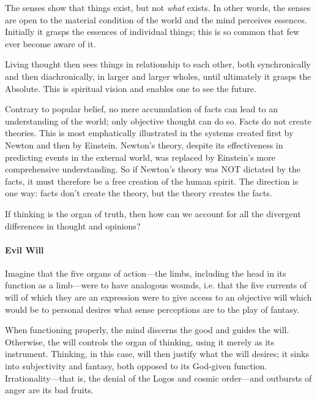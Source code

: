The senses show that things exist, but not \emph{what} exists. In other words, the senses are open to the material condition of the world and the mind perceives essences. Initially it grasps the essences of individual things; this is so common that few ever become aware of it.

Living thought then sees things in relationship to each other, both synchronically and then diachronically, in larger and larger wholes, until ultimately it grasps the Absolute. This is spiritual vision and enables one to see the future.

Contrary to popular belief, no mere accumulation of facts can lead to an understanding of the world; only objective thought can do so. Facts do not create theories. This is most emphatically illustrated in the systems created first by Newton and then by Einstein. Newton's theory, despite its effectiveness in predicting events in the external world, was replaced by Einstein's more comprehensive understanding. So if Newton's theory was NOT dictated by the facts, it must therefore be a free creation of the human spirit. The direction is one way: facts don't create the theory, but the theory creates the facts.

If thinking is the organ of truth, then how can we account for all the divergent differences in thought and opinions?

\paragraph{Evil Will}


\begin{quotex}
Imagine that the five organs of action---the limbs, including the head in its function as a limb---were to have analogous wounds, i.e. that the five currents of will of which they are an expression were to give access to an objective will which would be to personal desires what sense perceptions are to the play of fantasy.
\end{quotex}


When functioning properly, the mind discerns the good and guides the will. Otherwise, the will controls the organ of thinking, using it merely as its instrument. Thinking, in this case, will then justify what the will desires; it sinks into subjectivity and fantasy, both opposed to its God-given function. Irrationality---that is, the denial of the Logos and cosmic order---and outbursts of anger are its bad fruits.

